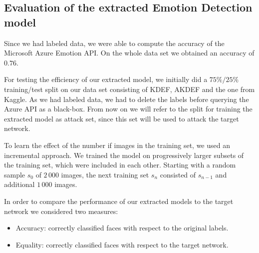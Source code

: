 \documentclass[a4paper,11pt]{article}
\begin{document}
        
    \subsection{Evaluation of the extracted Emotion Detection model}
        Since we had labeled data, we were able to compute the accuracy of the Microsoft Azure Emotion API. On the whole data set we obtained an accuracy of $0.76$.
        
        For testing the efficiency of our extracted model, we initially did a $75\%/25\%$ training/test split on our data set consisting of KDEF, AKDEF and the one from Kaggle. As we had labeled data, we had to delete the labels before querying the Azure API as a black-box. From now on we will refer to the split for training the extracted model as attack set, since this set will be used to attack the target network.
        
        To learn the effect of the number if images in the training set, we used an incremental approach. We trained the model on progressively larger subsets of the training set, which were included in each other. Starting with a random sample $s_0$ of $2\,000$ images, the next training set $s_n$ consisted of $s_{n-1}$ and additional $1\,000$ images.
        
        In order to compare the performance of our extracted models to the target network we considered two measures:
        \begin{itemize}
            \item Accuracy: correctly classified faces with respect to the original labels.
            \item Equality: correctly classified faces with respect to the target network.  
        \end{itemize}
        
        
\end{document}
